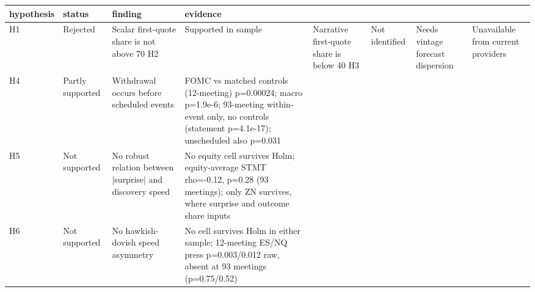 \begin{tabular}{llll}
\toprule
hypothesis & status & finding & evidence \\
\midrule
H1 & Rejected & Scalar first-quote share is not above 70%
H2 & Supported in sample & Narrative first-quote share is below 40%
H3 & Not identified & Needs vintage forecast dispersion & Unavailable from current providers \\
H4 & Partly supported & Withdrawal occurs before scheduled events & FOMC vs matched controls (12-meeting) p=0.00024; macro p=1.9e-6; 93-meeting within-event only, no controls (statement p=4.1e-17); unscheduled also p=0.031 \\
H5 & Not supported & No robust relation between |surprise| and discovery speed & No equity cell survives Holm; equity-average STMT rho=-0.12, p=0.28 (93 meetings); only ZN survives, where surprise and outcome share inputs \\
H6 & Not supported & No hawkish-dovish speed asymmetry & No cell survives Holm in either sample; 12-meeting ES/NQ press p=0.003/0.012 raw, absent at 93 meetings (p=0.75/0.52) \\
\bottomrule
\end{tabular}
